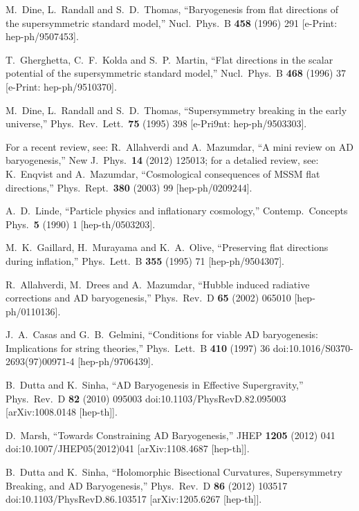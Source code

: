 \documentclass[11pt,a4paper]{article}
\begin{document}
\begin{thebibliography}{99}
  M.~Dine, L.~Randall and S.~D.~Thomas,
  ``Baryogenesis from flat directions of the supersymmetric standard model,''
  Nucl.\ Phys.\ B {\bf 458} (1996) 291
  [e-Print: hep-ph/9507453].

T.~Gherghetta, C.~F.~Kolda and S.~P.~Martin,
  ``Flat directions in the scalar potential of the supersymmetric standard model,''
  Nucl.\ Phys.\ B {\bf 468} (1996) 37 [e-Print: hep-ph/9510370].

  M.~Dine, L.~Randall and S.~D.~Thomas,
  ``Supersymmetry breaking in the early universe,''
  Phys.\ Rev.\ Lett.\  {\bf 75} (1995) 398 [e-Pri9nt: hep-ph/9503303].

For a recent review, see: R.~Allahverdi and A.~Mazumdar,
  ``A mini review on AD baryogenesis,''
  New J.\ Phys.\  {\bf 14} (2012) 125013; for a detalied review, see:  K.~Enqvist and A.~Mazumdar,
  ``Cosmological consequences of MSSM flat directions,''
  Phys.\ Rept.\  {\bf 380} (2003) 99
  [hep-ph/0209244]. 

  A.~D.~Linde,
  ``Particle physics and inflationary cosmology,''
  Contemp.\ Concepts Phys.\  {\bf 5} (1990) 1
  [hep-th/0503203].

  M.~K.~Gaillard, H.~Murayama and K.~A.~Olive,
  ``Preserving flat directions during inflation,''
  Phys.\ Lett.\ B {\bf 355} (1995) 71
  [hep-ph/9504307].

  R.~Allahverdi, M.~Drees and A.~Mazumdar,
  ``Hubble induced radiative corrections and AD baryogenesis,''
  Phys.\ Rev.\ D {\bf 65} (2002) 065010
  [hep-ph/0110136].

  J.~A.~Casas and G.~B.~Gelmini,
  ``Conditions for viable AD baryogenesis: Implications for string theories,''
  Phys.\ Lett.\ B {\bf 410} (1997) 36
  doi:10.1016/S0370-2693(97)00971-4
  [hep-ph/9706439].

  B.~Dutta and K.~Sinha,
  ``AD Baryogenesis in Effective Supergravity,''
  Phys.\ Rev.\ D {\bf 82} (2010) 095003
  doi:10.1103/PhysRevD.82.095003
  [arXiv:1008.0148 [hep-th]].

  D.~Marsh,
  ``Towards Constraining AD Baryogenesis,''
  JHEP {\bf 1205} (2012) 041
  doi:10.1007/JHEP05(2012)041
  [arXiv:1108.4687 [hep-th]].

  B.~Dutta and K.~Sinha,
  ``Holomorphic Bisectional Curvatures, Supersymmetry Breaking, and AD Baryogenesis,''
  Phys.\ Rev.\ D {\bf 86} (2012) 103517
  doi:10.1103/PhysRevD.86.103517
  [arXiv:1205.6267 [hep-th]].


\end{thebibliography}
\end{document}
